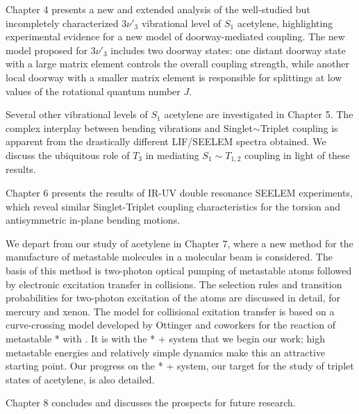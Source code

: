 \documentclass[12pt]{mitthesis}
\begin{document}
Chapter 4 presents a new and extended analysis of the well-studied but
incompletely characterized $3\nu'_3$ vibrational level of $S_1$
acetylene, highlighting experimental evidence for a new model of
doorway-mediated coupling.  The new model proposed for $3\nu'_3$
includes two doorway states: one distant doorway state with a large
matrix element controls the overall coupling strength, while another
local doorway with a smaller matrix element is responsible for
splittings at low values of the rotational quantum number $J$.

Several other vibrational levels of $S_1$ acetylene are investigated
in Chapter 5.  The complex interplay between bending vibrations and
Singlet$\sim$Triplet coupling is apparent from the drastically
different LIF/SEELEM spectra obtained.  We discuss the ubiquitous role
of $T_3$ in mediating $S_1 \sim T_{1,2}$ coupling in light of these
results.  

Chapter 6 presents the results of IR-UV double resonance
SEELEM experiments, which reveal similar Singlet-Triplet coupling
characteristics for the torsion and antisymmetric in-plane bending
motions.

We depart from our study of acetylene in Chapter 7, where a new method
for the manufacture of metastable molecules in a molecular beam is
considered.  The basis of this method is two-photon optical pumping of
metastable atoms followed by electronic excitation transfer in
collisions.  The selection rules and transition probabilities for
two-photon excitation of the atoms are discussed in detail, for
mercury and xenon.  The model for collisional exitation transfer is
based on a curve-crossing model developed by Ottinger and coworkers
for the reaction of metastable * with .  It is with the
* +  system that we begin our work; high metastable
energies and relatively simple dynamics make this an attractive
starting point. Our progress on the * +  system, our
target for the study of triplet states of acetylene, is also detailed.

Chapter 8 concludes and discusses the prospects for future
research.



\end{document}
